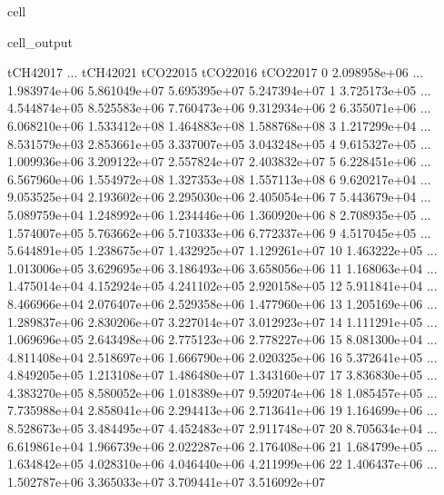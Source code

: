 \documentclass[letterpaper,10pt,english]{jupyterBook}
\begin{document}
\begin{sphinxuseclass}{cell}
\begin{sphinxVerbatimOutput}
\begin{sphinxuseclass}{cell_output}
\begin{sphinxVerbatim}[commandchars=\\\{\}]
       tCH4\PYGZus{}2017  ...     tCH4\PYGZus{}2021     tCO2\PYGZus{}2015     tCO2\PYGZus{}2016     tCO2\PYGZus{}2017  \PYGZbs{}
0   2.098958e+06  ...  1.983974e+06  5.861049e+07  5.695395e+07  5.247394e+07   
1   3.725173e+05  ...  4.544874e+05  8.525583e+06  7.760473e+06  9.312934e+06   
2   6.355071e+06  ...  6.068210e+06  1.533412e+08  1.464883e+08  1.588768e+08   
3   1.217299e+04  ...  8.531579e+03  2.853661e+05  3.337007e+05  3.043248e+05   
4   9.615327e+05  ...  1.009936e+06  3.209122e+07  2.557824e+07  2.403832e+07   
5   6.228451e+06  ...  6.567960e+06  1.554972e+08  1.327353e+08  1.557113e+08   
6   9.620217e+04  ...  9.053525e+04  2.193602e+06  2.295030e+06  2.405054e+06   
7   5.443679e+04  ...  5.089759e+04  1.248992e+06  1.234446e+06  1.360920e+06   
8   2.708935e+05  ...  1.574007e+05  5.763662e+06  5.710333e+06  6.772337e+06   
9   4.517045e+05  ...  5.644891e+05  1.238675e+07  1.432925e+07  1.129261e+07   
10  1.463222e+05  ...  1.013006e+05  3.629695e+06  3.186493e+06  3.658056e+06   
11  1.168063e+04  ...  1.475014e+04  4.152924e+05  4.241102e+05  2.920158e+05   
12  5.911841e+04  ...  8.466966e+04  2.076407e+06  2.529358e+06  1.477960e+06   
13  1.205169e+06  ...  1.289837e+06  2.830206e+07  3.227014e+07  3.012923e+07   
14  1.111291e+05  ...  1.069696e+05  2.643498e+06  2.775123e+06  2.778227e+06   
15  8.081300e+04  ...  4.811408e+04  2.518697e+06  1.666790e+06  2.020325e+06   
16  5.372641e+05  ...  4.849205e+05  1.213108e+07  1.486480e+07  1.343160e+07   
17  3.836830e+05  ...  4.383270e+05  8.580052e+06  1.018389e+07  9.592074e+06   
18  1.085457e+05  ...  7.735988e+04  2.858041e+06  2.294413e+06  2.713641e+06   
19  1.164699e+06  ...  8.528673e+05  3.484495e+07  4.452483e+07  2.911748e+07   
20  8.705634e+04  ...  6.619861e+04  1.966739e+06  2.022287e+06  2.176408e+06   
21  1.684799e+05  ...  1.634842e+05  4.028310e+06  4.046440e+06  4.211999e+06   
22  1.406437e+06  ...  1.502787e+06  3.365033e+07  3.709441e+07  3.516092e+07   


\end{sphinxVerbatim}
\end{sphinxuseclass}
\end{sphinxVerbatimOutput}
\end{sphinxuseclass}
\end{document}

